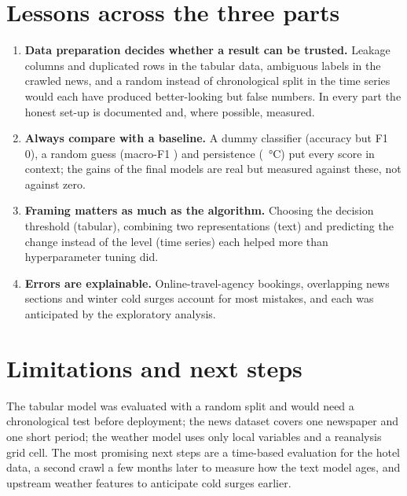 \documentclass[11pt,a4paper,openany]{report}
\begin{document}
\section{Lessons across the three parts}
\begin{enumerate}
\item \textbf{Data preparation decides whether a result can be trusted.} Leakage columns and duplicated rows in the tabular data,
ambiguous labels in the crawled news, and a random instead of chronological split in the time series would each have produced
better-looking but false numbers. In every part the honest set-up is documented and, where possible, measured.
\item \textbf{Always compare with a baseline.} A dummy classifier (accuracy \TBValDummyAcc{} but F1 0), a random guess (macro-F1
\TXRandTest) and persistence (\TSTestPersist~°C) put every score in context; the gains of the final models are real but measured
against these, not against zero.
\item \textbf{Framing matters as much as the algorithm.} Choosing the decision threshold (tabular), combining two representations
(text) and predicting the change instead of the level (time series) each helped more than hyperparameter tuning did.
\item \textbf{Errors are explainable.} Online-travel-agency bookings, overlapping news sections and winter cold surges account for
most mistakes, and each was anticipated by the exploratory analysis.
\end{enumerate}

\section{Limitations and next steps}
The tabular model was evaluated with a random split and would need a chronological test before deployment; the news dataset
covers one newspaper and one short period; the weather model uses only local variables and a reanalysis grid cell. The most
promising next steps are a time-based evaluation for the hotel data, a second crawl a few months later to measure how the text
model ages, and upstream weather features to anticipate cold surges earlier.

\appendix
\end{document}
